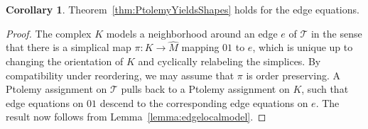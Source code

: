 \documentclass[12pt]{amsart}
\theoremstyle{definition}
\newtheorem{corollary}[theorem]{Corollary}
\numberwithin{equation}{section}
\def\T{\mathcal{T}}
\begin{document}
\begin{corollary} Theorem~\ref{thm:PtolemyYieldsShapes} holds for the edge equations.
\end{corollary}
\begin{proof}
The complex $K$ models a neighborhood around an edge $e$ of $\T$ in the sense that there is a simplical map $\pi\colon K\to\widehat{M}$ mapping $01$ to $e$, which is unique up to changing the orientation of $K$ and cyclically relabeling the simplices. By compatibility under reordering, we may assume that $\pi$ is order preserving. A Ptolemy assignment on $\T$ pulls back to a Ptolemy assignment on $K$, such that edge equations on $01$ descend to the corresponding edge equations on $e$. The result now follows from Lemma~\ref{lemma:edgelocalmodel}.  
\end{proof}
\end{document}
